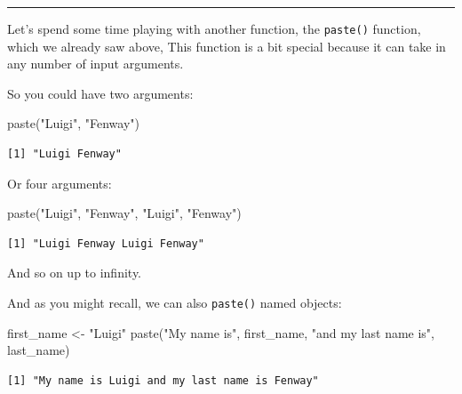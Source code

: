 \documentclass[
  letterpaper,
  DIV=11,
  numbers=noendperiod]{scrreprt}
\newenvironment{Shaded}{\begin{snugshade}}{\end{snugshade}}
\newcommand{\FunctionTok}[1]{\textcolor[rgb]{0.28,0.35,0.67}{#1}}
\newcommand{\NormalTok}[1]{\textcolor[rgb]{0.00,0.23,0.31}{#1}}
\newcommand{\OtherTok}[1]{\textcolor[rgb]{0.00,0.23,0.31}{#1}}
\newcommand{\StringTok}[1]{\textcolor[rgb]{0.13,0.47,0.30}{#1}}
\begin{document}
\begin{center}\rule{0.5\linewidth}{0.5pt}\end{center}

Let's spend some time playing with another function, the
\texttt{paste()} function, which we already saw above, This function is
a bit special because it can take in any number of input arguments.

So you could have two arguments:

\begin{Shaded}
\begin{Highlighting}[]
\FunctionTok{paste}\NormalTok{(}\StringTok{"Luigi"}\NormalTok{, }\StringTok{"Fenway"}\NormalTok{)}
\end{Highlighting}
\end{Shaded}

\begin{verbatim}
[1] "Luigi Fenway"
\end{verbatim}

Or four arguments:

\begin{Shaded}
\begin{Highlighting}[]
\FunctionTok{paste}\NormalTok{(}\StringTok{"Luigi"}\NormalTok{, }\StringTok{"Fenway"}\NormalTok{, }\StringTok{"Luigi"}\NormalTok{, }\StringTok{"Fenway"}\NormalTok{)}
\end{Highlighting}
\end{Shaded}

\begin{verbatim}
[1] "Luigi Fenway Luigi Fenway"
\end{verbatim}

And so on up to infinity.

And as you might recall, we can also \texttt{paste()} named objects:

\begin{Shaded}
\begin{Highlighting}[]
\NormalTok{first\_name }\OtherTok{\textless{}{-}} \StringTok{"Luigi"}
\FunctionTok{paste}\NormalTok{(}\StringTok{"My name is"}\NormalTok{, first\_name, }\StringTok{"and my last name is"}\NormalTok{, last\_name)}
\end{Highlighting}
\end{Shaded}

\begin{verbatim}
[1] "My name is Luigi and my last name is Fenway"
\end{verbatim}
\end{document}
